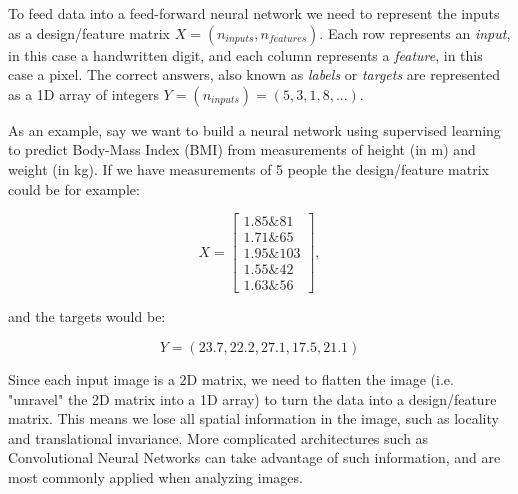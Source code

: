 \documentclass[%
oneside,                 %
final,                   %
10pt]{article}
\begin{document}
To feed data into a feed-forward neural network we need to represent
the inputs as a design/feature matrix $X = (n_{inputs}, n_{features})$.  Each
row represents an \emph{input}, in this case a handwritten digit, and
each column represents a \emph{feature}, in this case a pixel.  The
correct answers, also known as \emph{labels} or \emph{targets} are
represented as a 1D array of integers 
$Y = (n_{inputs}) = (5, 3, 1, 8,...)$.

As an example, say we want to build a neural network using supervised learning to predict Body-Mass Index (BMI) from
measurements of height (in m)  
and weight (in kg). If we have measurements of 5 people the design/feature matrix could be for example:  

$$ X = \begin{bmatrix}
1.85 {\&} 81\\
1.71 {\&} 65\\
1.95 {\&} 103\\
1.55 {\&} 42\\
1.63 {\&} 56
\end{bmatrix} ,$$  

and the targets would be:  

$$ Y = (23.7, 22.2, 27.1, 17.5, 21.1) $$  

Since each input image is a 2D matrix, we need to flatten the image
(i.e. "unravel" the 2D matrix into a 1D array) to turn the data into a
design/feature matrix. This means we lose all spatial information in the
image, such as locality and translational invariance. More complicated
architectures such as Convolutional Neural Networks can take advantage
of such information, and are most commonly applied when analyzing
images.
\end{document}
